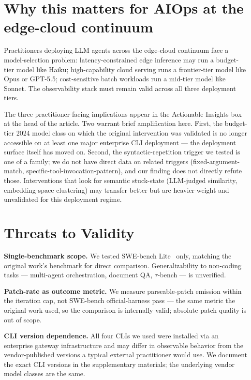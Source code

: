 \documentclass[journal]{IEEEtran}
\begin{document}
\section{Why this matters for AIOps at the edge-cloud continuum}

Practitioners deploying LLM agents across the edge-cloud continuum face a model-selection problem: latency-constrained edge inference may run a budget-tier model like Haiku; high-capability cloud serving runs a frontier-tier model like Opus or GPT-5.5; cost-sensitive batch workloads run a mid-tier model like Sonnet. The observability stack must remain valid across all three deployment tiers.

The three practitioner-facing implications appear in the Actionable Insights box at the head of the article. Two warrant brief amplification here. First, the budget-tier 2024 model class on which the original intervention was validated is no longer accessible on at least one major enterprise CLI deployment --- the deployment surface itself has moved on. Second, the syntactic-repetition trigger we tested is one of a family; we do not have direct data on related triggers (fixed-argument-match, specific-tool-invocation-pattern), and our finding does not directly refute those. Interventions that look for semantic stuck-state (LLM-judged similarity, embedding-space clustering) may transfer better but are heavier-weight and unvalidated for this deployment regime.

\section{Threats to Validity}

\textbf{Single-benchmark scope.} We tested SWE-bench Lite~\cite{swebench} only, matching the original work's benchmark for direct comparison. Generalizability to non-coding tasks --- multi-agent orchestration, document QA, $\tau$-bench --- is unverified.

\textbf{Patch-rate as outcome metric.} We measure parseable-patch emission within the iteration cap, not SWE-bench official-harness pass --- the same metric the original work used, so the comparison is internally valid; absolute patch quality is out of scope.

\textbf{CLI version dependence.} All four CLIs we used were installed via an enterprise gateway infrastructure and may differ in observable behavior from the vendor-published versions a typical external practitioner would use. We document the exact CLI versions in the supplementary materials; the underlying vendor model classes are the same.
\end{document}
